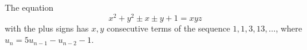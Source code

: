 \begin{proposition}\label{eq:118}
    The equation
\[
    x^2+y^2\pm x\pm y+1=xyz
\]
    with the plus signs has $x,y$ consecutive terms of the sequence $1,1,3,13,\ldots$, where $u_n=5u_{n-1}-u_{n-2}-1$.
\end{proposition}
